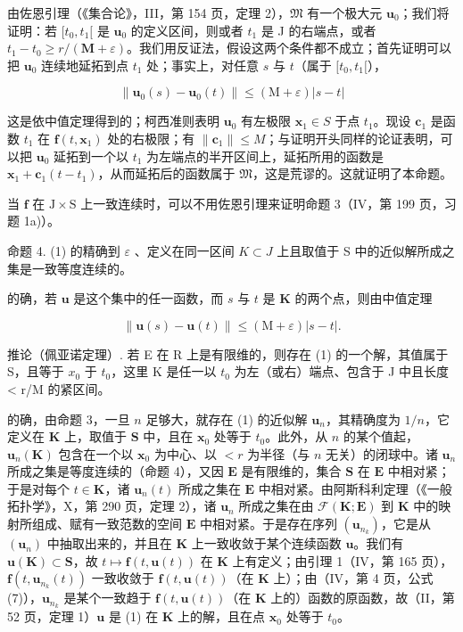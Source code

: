 由佐恩引理（《集合论》，III，第 154 页，定理 2），\(\mathfrak{M}\) 有一个极大元 \(\mathbf{u}_0\)；我们将证明：若 \([t_0, t_1[\) 是 \(\mathbf{u}_0\) 的定义区间，则或者 \(t_1\) 是 J 的右端点，或者 \(t_1 - t_0 \geqslant r / (\mathbf{M} + \varepsilon)\)。我们用反证法，假设这两个条件都不成立；首先证明可以把 \(\mathbf{u}_0\) 连续地延拓到点 \(t_1\) 处；事实上，对任意 \(s\) 与 \(t\)（属于 \([t_0, t_1[\)），

\[
\left\| \mathbf {u} _ {0} (s) - \mathbf {u} _ {0} (t) \right\| \leqslant (\mathrm{M} + \varepsilon) | s - t |
\]

这是依中值定理得到的；柯西准则表明 \(\mathbf{u}_0\) 有左极限 \(\mathbf{x}_1 \in S\) 于点 \(t_1\)。现设 \(\mathbf{c}_1\) 是函数 \(t_1\) 在 \(\mathbf{f}(t, \mathbf{x}_1)\) 处的右极限；有 \(\| \mathbf{c}_1 \| \leqslant M\)；与证明开头同样的论证表明，可以把 \(\mathbf{u}_0\) 延拓到一个以 \(t_1\) 为左端点的半开区间上，延拓所用的函数是 \(\mathbf{x}_1 + \mathbf{c}_1 (t - t_1)\)，从而延拓后的函数属于 \(\mathfrak{M}\)，这是荒谬的。这就证明了本命题。

当 \(\mathbf{f}\) 在 \(\mathrm{J} \times \mathrm{S}\) 上一致连续时，可以不用佐恩引理来证明命题 3（IV，第 199 页，习题 1a)）。

命题 4. (1) 的精确到 \(\varepsilon\) 、定义在同一区间 \(K \subset J\) 上且取值于 S 中的近似解所成之集是一致等度连续的。

的确，若 \(\mathbf{u}\) 是这个集中的任一函数，而 \(s\) 与 \(t\) 是 \(\mathbf{K}\) 的两个点，则由中值定理

\[
\left\| \mathbf {u} (s) - \mathbf {u} (t) \right\| \leqslant (\mathrm{M} + \varepsilon) | s - t |.
\]

推论（佩亚诺定理）. 若 E 在 R 上是有限维的，则存在 (1) 的一个解，其值属于 S，且等于 \(x_{0}\) 于 \(t_{0}\)，这里 K 是任一以 \(t_{0}\) 为左（或右）端点、包含于 J 中且长度 \textless{} r/M 的紧区间。

的确，由命题 3，一旦 \(n\) 足够大，就存在 (1) 的近似解 \(\mathbf{u}_n\)，其精确度为 \(1/n\)，它定义在 \(\mathbf{K}\) 上，取值于 \(\mathbf{S}\) 中，且在 \(\mathbf{x}_0\) 处等于 \(t_0\)。此外，从 \(n\) 的某个值起，\(\mathbf{u}_n(\mathbf{K})\) 包含在一个以 \(\mathbf{x}_0\) 为中心、以 \(< r\) 为半径（与 \(n\) 无关）的闭球中。诸 \(\mathbf{u}_n\) 所成之集是等度连续的（命题 4），又因 \(\mathbf{E}\) 是有限维的，集合 \(\mathbf{S}\) 在 \(\mathbf{E}\) 中相对紧；于是对每个 \(t \in \mathbf{K}\)，诸 \(\mathbf{u}_n(t)\) 所成之集在 \(\mathbf{E}\) 中相对紧。由阿斯科利定理（《一般拓扑学》，X，第 290 页，定理 2），诸 \(\mathbf{u}_n\) 所成之集在由 \(\mathcal{F}(\mathbf{K};\mathbf{E})\) 到 \(\mathbf{K}\) 中的映射所组成、赋有一致范数的空间 \(\mathbf{E}\) 中相对紧。于是存在序列 \((\mathbf{u}_{n_k})\)，它是从 \((\mathbf{u}_n)\) 中抽取出来的，并且在 \(\mathbf{K}\) 上一致收敛于某个连续函数 \(\mathbf{u}\)。我们有 \(\mathbf{u}(\mathbf{K}) \subset \mathbf{S}\)，故 \(t \mapsto \mathbf{f}(t,\mathbf{u}(t))\) 在 \(\mathbf{K}\) 上有定义；由引理 1（IV，第 165 页），\(\mathbf{f}(t,\mathbf{u}_{n_k}(t))\) 一致收敛于 \(\mathbf{f}(t,\mathbf{u}(t))\)（在 \(\mathbf{K}\) 上）；由（IV，第 4 页，公式 (7)），\(\mathbf{u}_{n_k}\) 是某个一致趋于 \(\mathbf{f}(t,\mathbf{u}(t))\)（在 \(\mathbf{K}\) 上的）函数的原函数，故（II，第 52 页，定理 1）\(\mathbf{u}\) 是 (1) 在 \(\mathbf{K}\) 上的解，且在点 \(\mathbf{x}_0\) 处等于 \(t_0\)。

